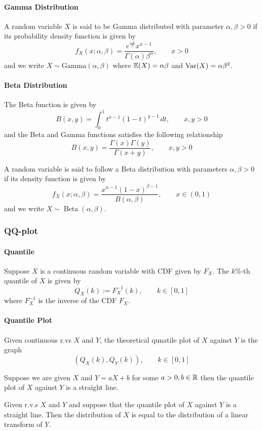 \paragraph{Gamma Distribution}
A random variable \(X\) is said to be Gamma distributed with parameter \(\alpha, \beta > 0\) if its probability density function is given by 
\[f_X(x;\alpha,\beta) = \frac{e^{\frac{-x}{\beta}}x^{\alpha-1}}{\Gamma(\alpha)\beta^\alpha}, \qquad x > 0\]
and we write \(X \sim \mathrm{Gamma}(\alpha,\beta)\) where \(\mathbb{E}(X) = \alpha\beta\) and \(\mathrm{Var}(X) = \alpha\beta^2\).

\paragraph{Beta Distribution}
The Beta function is given by 
\[B(x,y) = \int_0^1 t^{x-1}(1-t)^{y-1} \, dt, \qquad x,y > 0\]
and the Beta and Gamma functions satisfies the following relationship
\[B(x,y) = \frac{\Gamma(x)\Gamma(y)}{\Gamma(x+y)}, \qquad x,y > 0\]

A random variable is said to follow a Beta distribution with parameters \(\alpha, \beta > 0\) if its density function is given by 
\[f_X(x; \alpha, \beta) = \frac{x^{\alpha - 1}(1-x)^{\beta - 1}}{B(\alpha, \beta)}, \qquad x \in (0,1)\]
and we write \(X \sim \operatorname{Beta}(\alpha, \beta)\).

\subsubsection{QQ-plot}
\paragraph{Quantile}
Suppose \(X\) is a continuous random variable with CDF given by \(F_X\). The \(k\%\)-th quantile of \(X\) is given by
\[Q_X(k) := F_X^{-1}(k), \qquad k \in [0,1]\]
where \(F_X^{-1}\) is the inverse of the CDF \(F_X\).

\paragraph{Quantile Plot}
Given continuous r.vs \(X\) and \(Y\), the theoretical qunatile plot of \(X\) against \(Y\) is the graph
\[(Q_X(k), Q_Y(k)), \qquad k\in[0,1]\]

Suppose we are given \(X\) and \(Y = aX + b\) for some \(a > 0, b \in \mathbb{R}\) then the quantile plot of \(X\) against \(Y\) is a straight line.

Given r.v.s \(X\) and \(Y\) and suppose that the quantile plot of \(X\) against \(Y\) is a straight line. Then the distribution of \(X\) is equal to the distribution of a linear transform of \(Y\).

